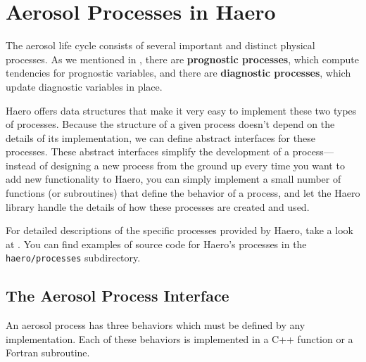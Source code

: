 \section{Aerosol Processes in Haero}

The aerosol life cycle consists of several important and distinct physical
processes. As we mentioned in , there are
{\bf prognostic processes}, which compute tendencies for prognostic variables,
and there are {\bf diagnostic processes}, which update diagnostic variables
in place.

Haero offers data structures that make it very easy to implement these two types
of processes. Because the structure of a given process doesn't depend on the
details of its implementation, we can define abstract interfaces for these
processes. These abstract interfaces simplify the development of a process---
instead of designing a new process from the ground up every time you want to
add new functionality to Haero, you can simply implement a small number of
functions (or subroutines) that define the behavior of a process, and let the
Haero library handle the details of how these processes are created and used.

For detailed descriptions of the specific processes provided by Haero, take a
look at . You can find examples of source code for
Haero's processes in the \texttt{haero/processes} subdirectory.

\subsection{The Aerosol Process Interface}

An aerosol process has three behaviors which must be defined by any
implementation. Each of these behaviors is implemented in a C++ function or
a Fortran subroutine.

